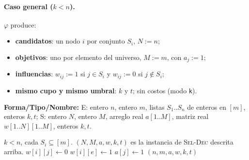 \paragraph{Caso general ($k<n$).} $\varphi$ produce:
\begin{itemize}[leftmargin=*]
\item \textbf{candidatos}: un nodo $i$ por conjunto $S_i$, $N:=n$;
\item \textbf{objetivos}: uno por elemento del universo, $M:=m$, con $a_j:=1$;
\item \textbf{influencias}: $w_{ij}:=1$ si $j\in S_i$ y $w_{ij}:=0$ si $j\notin S_i$;
\item \textbf{mismo cupo y mismo umbral}: $k$ y $t$; sin costos (modo \texttt{k}).
\end{itemize}

\begin{algorithm}[h]
\caption{Transformación $\varphi$ (caso $k<n$)}\label{alg:phi}
\textbf{Forma/Tipo/Nombre:} E: entero $n$, entero $m$, listas $S_1..S_n$ de enteros en $[m]$, enteros $k,t$; S: entero $N$, entero $M$, arreglo real $a[1..M]$, matriz real $w[1..N][1..M]$, enteros $k,t$.
\begin{algorithmic}[1]
\Require $k<n$, cada $S_i\subseteq[m]$.
\Ensure $(N,M,a,w,k,t)$ es la instancia de \textsc{Sel-Dec} descrita arriba.
    \State $w[i][j]\gets 0$
  \EndFor
    \State $w[i][e]\gets 1$
  \EndFor
\EndFor
{}
  \State $a[j]\gets 1$
\EndFor
\State \Return $(n,m,a,w,k,t)$
\end{algorithmic}
\end{algorithm}

